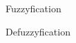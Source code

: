         \begin{multicols}{2}

            \begin{figure}[H]
                \centering
                \caption{Fuzzyfication}
                \label{fig:fuzzy_input}
            \end{figure}

            \begin{figure}[H]
                \centering
                \caption{Defuzzyfication}
                \label{fig:fuzzy_output}
            \end{figure}

        \end{multicols}

